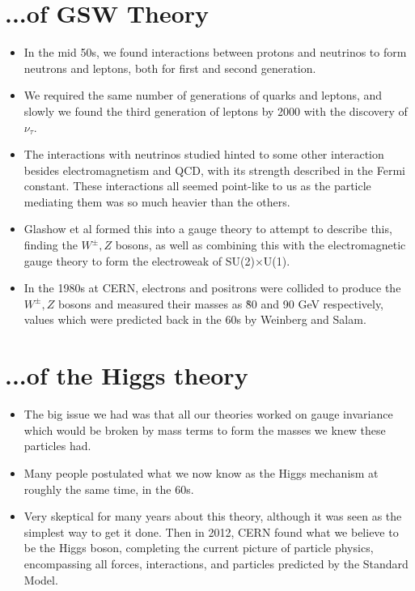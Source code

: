 \documentclass[a4paper, 11pt, normalem]{report}
\begin{document}
\section{...of GSW Theory}
\begin{itemize}
    \item In the mid 50s, we found interactions between protons and neutrinos to form neutrons and leptons, both for first and second generation.
    \item We required the same number of generations of quarks and leptons, and slowly we found the third generation of leptons by 2000 with the discovery of $\nu_\tau$.
    \item The interactions with neutrinos studied hinted to some other interaction besides electromagnetism and QCD, with its strength described in the Fermi constant.
        These interactions all seemed point-like to us as the particle mediating them was so much heavier than the others.
    \item Glashow et al formed this into a gauge theory to attempt to describe this, finding the $W^\pm,Z$ bosons, as well as combining this with the electromagnetic gauge theory to form the electroweak of SU(2)$\times$U(1).
    \item In the 1980s at CERN, electrons and positrons were collided to produce the $W^\pm,Z$ bosons and measured their masses as \~80 and 90 GeV respectively, values which were predicted back in the 60s by Weinberg and Salam.
\end{itemize}

\section{...of the Higgs theory}
\begin{itemize}
    \item The big issue we had was that all our theories worked on gauge invariance which would be broken by mass terms to form the masses we knew these particles had.
    \item Many people postulated what we now know as the Higgs mechanism at roughly the same time, in the 60s.
    \item Very skeptical for many years about this theory, although it was seen as the simplest way to get it done.
        Then in 2012, CERN found what we believe to be the Higgs boson, completing the current picture of particle physics, encompassing all forces, interactions, and particles predicted by the Standard Model.
\end{itemize}
\end{document}
